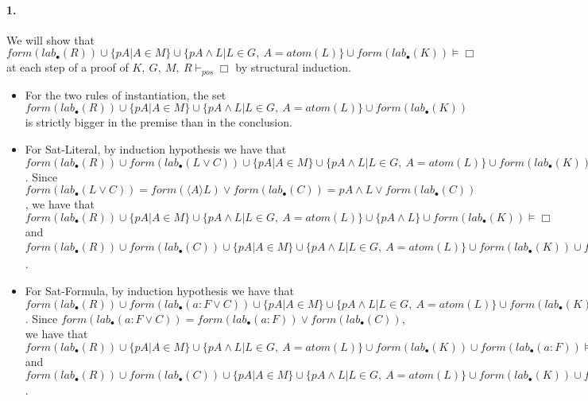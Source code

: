 \documentclass[a4paper,10pt]{article}
\newcommand{\atom}{\mathit{atom}}
\newcommand{\pos}{\vdash_\mathit{pos}}
\newcommand{\F}{\mathit{form}}
\newcommand{\T}{\mathit{lab}}
\begin{document}
\paragraph{1.}
We will show that $\F(\T_\bullet(R))\cup\{pA|A\in M\}\cup\{pA\wedge L|L\in G,\ A=\atom(L)\}
\cup\F(\T_\bullet(K))\vDash\Box$ at each step of a proof of
$K,\ G,\ M,\ R\pos\Box$ by structural induction. 
\begin{itemize}
 \item For the two rules of instantiation, the set
$\F(\T_\bullet(R))\cup\{pA|A\in M\}\cup\{pA\wedge L|L\in G,\ A=\atom(L)\}\cup\F(\T_\bullet(K))$
is strictly bigger in the premise than in the conclusion.
 \item For {\sc Sat-Literal}, by induction hypothesis we have that
$\F(\T_\bullet(R))\cup\F(\T_\bullet(L\vee C))\cup\{pA|A\in M\}\cup\{pA\wedge L|L\in G,\ A=\atom(L)\}
\cup\F(\T_\bullet(K))\vDash\Box$.
Since $\F(\T_\bullet(L\vee C))=\F(\langle A\rangle L)\vee\F(\T_\bullet(C))=
pA\wedge L\vee\F(\T_\bullet(C))$, we have that
$\F(\T_\bullet(R))\cup\{pA|A\in M\}\cup\{pA\wedge L|L\in G,\ A=\atom(L)\}
\cup\{pA\wedge L\}\cup\F(\T_\bullet(K))\vDash\Box$ and
$\F(\T_\bullet(R))\cup\F(\T_\bullet(C))\cup\{pA|A\in M\}\cup\{pA\wedge L|L\in G,\ A=\atom(L)\}
\cup\F(\T_\bullet(K))\cup\F(\T_\bullet(\overline L))\vDash\Box$.
 \item For {\sc Sat-Formula}, by induction hypothesis we have that
$\F(\T_\bullet(R))\cup\F(\T_\bullet(a:F\vee C))\cup\{pA|A\in M\}\cup\{pA\wedge L|L\in G,\ A=\atom(L)\}
\cup\F(\T_\bullet(K))\vDash\Box$.
Since $\F(\T_\bullet(a:F\vee C))=\F(\T_\bullet(a:F))\vee\F(\T_\bullet(C))$, we have that
$\F(\T_\bullet(R))\cup\{pA|A\in M\}\cup\{pA\wedge L|L\in G,\ A=\atom(L)\}
\cup\F(\T_\bullet(K))\cup\F(\T_\bullet(a:F))\vDash\Box$ and
$\F(\T_\bullet(R))\cup\F(\T_\bullet(C))\cup\{pA|A\in M\}\cup\{pA\wedge L|L\in G,\ A=\atom(L)\}
\cup\F(\T_\bullet(K))\cup\F(\T_\bullet(\downarrow\neg a:F))\vDash\Box$.
\end{itemize}
\end{document}
